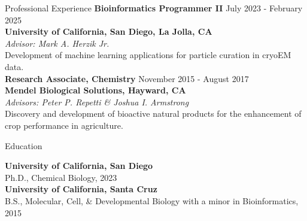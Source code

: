 \documentclass{cv}
\begin{document}
\begin{rSection}{Professional Experience}
{\bf Bioinformatics Programmer II} \hfill    July 2023 - February 2025
\\ {\bf University of California, San Diego, La Jolla, CA} 
\\ {\em Advisor: Mark A. Herzik Jr.}
\\ Development of machine learning applications for particle curation in cryoEM data.\\

{\bf Research Associate, Chemistry} \hfill    November 2015 - August 2017 
\\ {\bf Mendel Biological Solutions, Hayward, CA} 
\\ {\em Advisors: Peter P. Repetti \& Joshua I. Armstrong}
\\ Discovery and development of bioactive natural products for the enhancement of crop performance in agriculture.\\
\end{rSection}


\begin{rSection}{Education}

{\bf University of California, San Diego}
\\Ph.D., Chemical Biology, 2023\\


{\bf University of California, Santa Cruz}
\\B.S., Molecular, Cell, \& Developmental Biology with a minor in Bioinformatics, 2015\\

\end{rSection}


		
	
\end{document}
